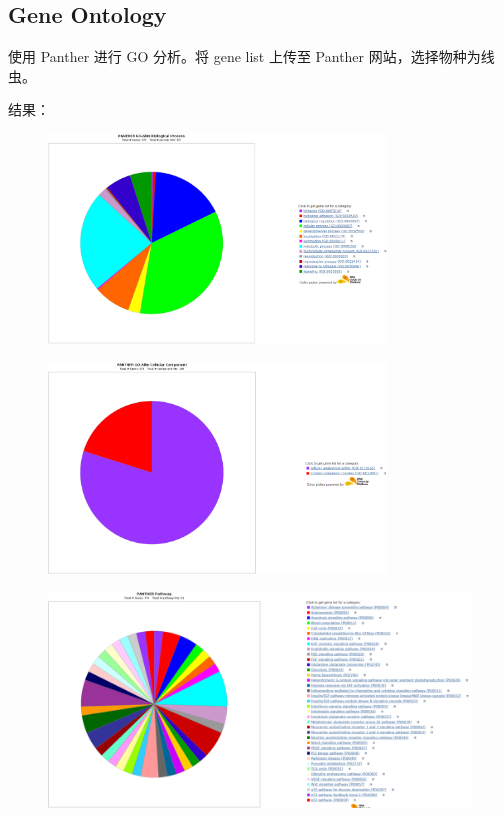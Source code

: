 \documentclass[UTF8]{ctexart}
\begin{document}
\clearpage

\subsection{Gene Ontology}
使用 Panther 进行 GO 分析。将 gene list 上传至 Panther 网站，选择物种为线虫。

结果：

\begin{figure}[htb]
	\centering
	\includegraphics[width=0.8\textwidth]{img/GO_BioPro.png}
\end{figure}

\begin{figure}[h]
	\centering
	\includegraphics[width=0.8\textwidth]{img/GO_CelCom.png}
\end{figure}

\clearpage

\begin{figure}[h]
	\centering
	\includegraphics[width=\textwidth]{img/GO_Path.png}
\end{figure}
\end{document}
